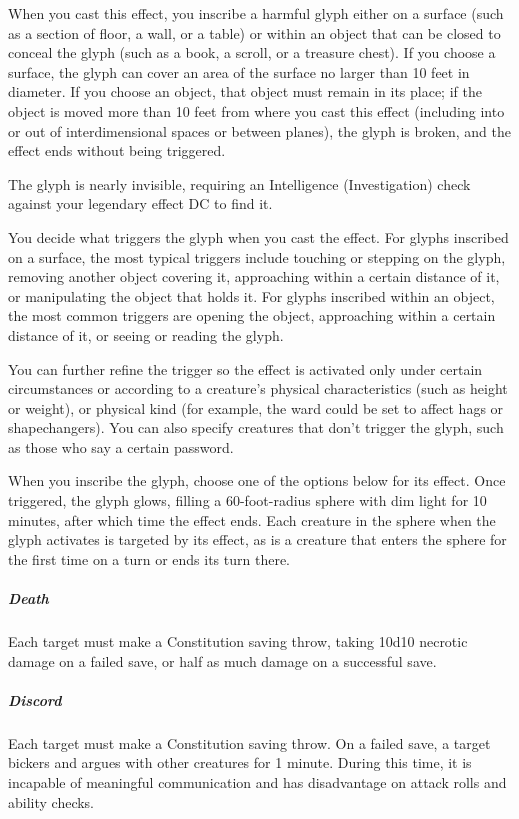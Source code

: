 When you cast this effect, you inscribe a harmful glyph either on a surface (such as a section of floor, a wall, or a table) or within an object that can be closed to conceal the glyph (such as a book, a scroll, or a treasure chest). If you choose a surface, the glyph can cover an area of the surface no larger than 10 feet in diameter. If you choose an object, that object must remain in its place; if the object is moved more than 10 feet from where you cast this effect (including into or out of interdimensional spaces or between planes), the glyph is broken, and the effect ends without being triggered.

The glyph is nearly invisible, requiring an Intelligence (Investigation) check against your legendary effect DC to find it.

You decide what triggers the glyph when you cast the effect. For glyphs inscribed on a surface, the most typical triggers include touching or stepping on the glyph, removing another object covering it, approaching within a certain distance of it, or manipulating the object that holds it. For glyphs inscribed within an object, the most common triggers are opening the object, approaching within a certain distance of it, or seeing or reading the glyph.

You can further refine the trigger so the effect is activated only under certain circumstances or according to a creature's physical characteristics (such as height or weight), or physical kind (for example, the ward could be set to affect hags or shapechangers). You can also specify creatures that don't trigger the glyph, such as those who say a certain password.

When you inscribe the glyph, choose one of the options below for its effect. Once triggered, the glyph glows, filling a 60-foot-radius sphere with dim light for 10 minutes, after which time the effect ends. Each creature in the sphere when the glyph activates is targeted by its effect, as is a creature that enters the sphere for the first time on a turn or ends its turn there.

\subparagraph{Death} Each target must make a Constitution saving throw, taking 10d10 necrotic damage on a failed save, or half as much damage on a successful save.

\subparagraph{Discord} Each target must make a Constitution saving throw. On a failed save, a target bickers and argues with other creatures for 1 minute. During this time, it is incapable of meaningful communication and has disadvantage on attack rolls and ability checks.


